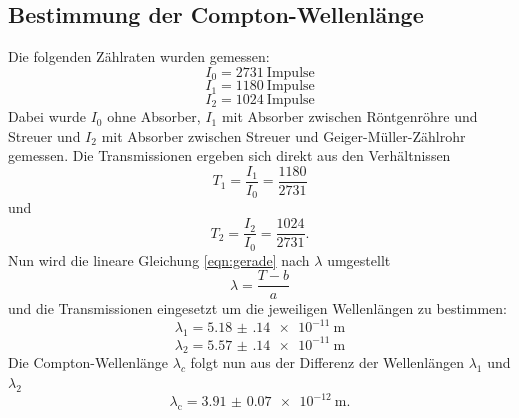\subsection{Bestimmung der Compton-Wellenlänge}
\label{sec:compton}
Die folgenden Zählraten wurden gemessen:
\begin{equation*}
    I_0 = \SI{2731}{\text{Impulse}}
\end{equation*}
\begin{equation*}
    I_1 = \SI{1180}{\text{Impulse}}
\end{equation*}
\begin{equation*}
    I_2 = \SI{1024}{\text{Impulse}}
\end{equation*}
Dabei wurde $I_0$ ohne Absorber, $I_1$ mit Absorber zwischen Röntgenröhre und Streuer und $I_2$ mit Absorber zwischen Streuer und Geiger-Müller-Zählrohr gemessen.
Die Transmissionen ergeben sich direkt aus den Verhältnissen
\begin{equation*}
    T_1 = \frac{I_1}{I_0} = \frac{1180}{2731}
\end{equation*}
und
\begin{equation*}
    T_2 = \frac{I_2}{I_0} = \frac{1024}{2731} .
\end{equation*}
Nun wird die lineare Gleichung \ref{eqn:gerade} nach $\lambda$ umgestellt
\begin{equation}
    \lambda = \frac{T - b}{a}
\end{equation}
und die Transmissionen eingesetzt um die jeweiligen Wellenlängen zu bestimmen:
\begin{equation*}
    \lambda_1 = \SI{5.18(14)e-11}{\metre}
\end{equation*}
\begin{equation*}
    \lambda_2 = \SI{5.57(14)e-11}{\metre}
\end{equation*}
Die Compton-Wellenlänge $\lambda_c$ folgt nun aus der Differenz der Wellenlängen $\lambda_1$ und $\lambda_2$
\begin{equation}
    \lambda_\text{c} = \SI{3.91(7)e-12}{\metre} .
    \label{eqn:lambdac}
\end{equation}